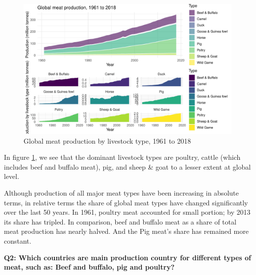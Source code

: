 \documentclass[11pt,a4paper,]{article}
\begin{document}
\begin{figure}
\centering
\includegraphics{report_files/figure-latex/productiontype-1.pdf}
\caption{\label{fig:productiontype}Global meat production by livestock type, 1961 to 2018}
\end{figure}

In figure \ref{fig:productiontype}, we see that the dominant livestock types are poultry, cattle (which includes beef and buffalo meat), pig, and sheep \& goat to a lesser extent at global level.

Although production of all major meat types have been increasing in absolute terms, in relative terms the share of global meat types have changed significantly over the last 50 years. In 1961, poultry meat accounted for small portion; by 2013 its share has tripled. In comparison, beef and buffalo meat as a share of total meat production has nearly halved. And the Pig meat's share has remained more constant.
\clearpage

\textbf{Q2: Which countries are main production country for different types of meat, such as: Beef and buffalo, pig and poultry? }
\end{document}
